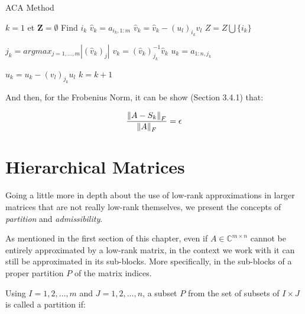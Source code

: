 \begin{algorithm}
    \caption{ACA Method}\label{alg:aca_method}
    \begin{algorithmic}[1]
        \State $k=1$ et $\mathbf{Z} = \emptyset $
        \Repeat
        \State Find $i_{k}$
        \State $\hat{v}_{k} = a_{i_{k},1:m} $
        \State $\hat{v}_{k} = \hat{v}_{k} - (u_{l})_{i_{k}}v_{l} $
        \EndFor
        \State $Z = Z \bigcup \{ i_{k} \} $

        \State $j_{k} = argmax_{j=1, \dots, m}|(\hat{v}_{k})_{j}|$
        \State $v_{k} = (\hat{v}_{k})^{-1}_{j_{k}} \hat{v}_{k}$
        \State $u_{k}=a_{1:n,j_{k}}$

        \State $u_{k}=u_{k} - (v_{l})_{j_{k}}u_{l}$
        \EndFor
        \State $k=k+1$

        \EndIf



    \end{algorithmic}
\end{algorithm}

And then, for the Frobenius Norm, it can be show \cite{trefethen1998numerical}(Section 3.4.1) that:

\begin{equation}\label{eq:stop_ACA}
    \frac{\left\lVert A - S_{k}\right\rVert_{F}}{\left\lVert A\right\rVert_{F}} = \epsilon
\end{equation}

\section{Hierarchical Matrices}

Going a little more in depth about the use of low-rank approximations in larger matrices that are not really low-rank themselves, we present the concepts of \textit{partition} and \textit{admissibility}.

As mentioned in the first section of this chapter, even if  $A \in \mathbb{C}^{m \times n} $ cannot be entirely approximated by a low-rank matrix, in the context we work with it can still be approximated in its sub-blocks. More specifically, in the sub-blocks of a proper partition $P$ of the matrix indices.

Using $I = {1,2, \dots, m}$ and $J={1,2, \dots, n}$, a subset $P$ from the set of subsets of $I \times J$ is called a partition if:

